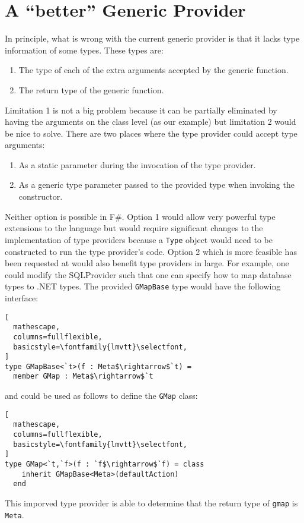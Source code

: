 \documentclass{sigplanconf}
\begin{document}
\section{A ``better'' Generic Provider}
In principle, what is wrong with the current generic provider is that
it lacks type information of some types. These types are:
\begin{enumerate}
\item The type of each of the extra arguments accepted by the generic function.
\item The return type of the generic function.
\end{enumerate}
Limitation 1 is not a big problem because it can be partially
eliminated by having the arguments on the class level (as our example)
but limitation 2 would be nice to solve. There are two places where
the type provider could accept type arguments:
\begin{enumerate}
\item As a static parameter during the invocation of the type provider.
\item As a generic type parameter passed to the provided type when invoking the constructor.
\end{enumerate}
Neither option is possible in F\#. Option 1 would allow very powerful
type extensions to the language but would require significant changes
to the implementation of type providers because a \verb+Type+ object
would need to be constructed to run the type provider's code. Option 2
which is more feasible has been requested at \cite{genericTypeArgs}
would also benefit type providers in large. For example, one could
modify the SQLProvider \cite{SQLProvider} such that one can specify
how to map database types to .NET types. The provided \verb+GMapBase+
type would have the following interface:
\begin{lstlisting}[
  mathescape,
  columns=fullflexible,
  basicstyle=\fontfamily{lmvtt}\selectfont,
]
type GMapBase<`t>(f : Meta$\rightarrow$`t) =
  member GMap : Meta$\rightarrow$`t
\end{lstlisting}
and could be used as follows to define the \verb+GMap+ class:
\begin{lstlisting}[
  mathescape,
  columns=fullflexible,
  basicstyle=\fontfamily{lmvtt}\selectfont,
]
type GMap<`t,`f>(f : `f$\rightarrow$`f) = class
    inherit GMapBase<Meta>(defaultAction)
  end
\end{lstlisting}
This imporved type provider is able to
determine that the return type of \verb+gmap+
is \verb+Meta+.
\end{document}

